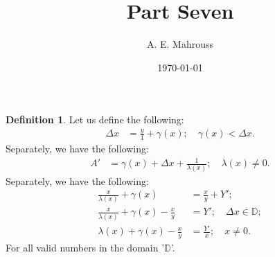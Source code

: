 \documentclass[10pt]{article}
\title{%
  \vspace{-1.5em}%
  \large\textbf{Part Seven}%
}
\author{A. E. Mahrouss}
\date{\today}
\theoremstyle{plain}
\theoremstyle{definition}
\newtheorem{definition}[theorem]{Definition}
\theoremstyle{remark}
\begin{document}
\begin{definition}
	Let us define the following:
	\begin{align*}
	\Delta x &=	\frac{y}{1} + \gamma(x); \quad \gamma(x) < \Delta x.
	\end{align*}
  Separately, we have the following:
	\begin{align*}
		A' &= \gamma(x)+\Delta x + \frac{1}{\lambda(x)}; \quad \lambda(x) \neq 0.
	\end{align*}
  Separately, we have the following:
	\begin{align*}
		\frac{x}{\lambda(x)} + \gamma(x) &= \frac{x}{y} + Y';\\
		\frac{x}{\lambda(x)} + \gamma(x) - \frac{x}{y} &= Y'; \quad \Delta x \in \mathbb{D};\\
		\lambda(x) + \gamma(x) -\frac{x}{y} &= \frac{Y'}{x}; \quad x \neq 0.
	\end{align*}
	For all valid numbers in the domain '$\mathbb{D}$'.
\end{definition}

\nocite{*}


\end{document}
